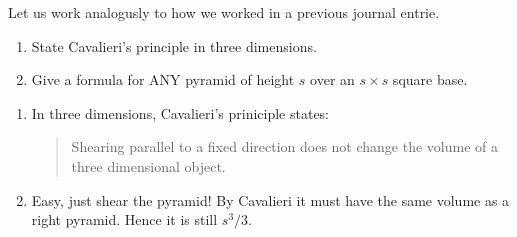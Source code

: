 \documentclass[nooutcomes,noauthor,handout]{ximera}
\begin{document}
\begin{question}
  Let us work analogusly to how we worked in a previous journal
  entrie.
  \begin{enumerate}
  \item State Cavalieri's principle in three dimensions.
  \item Give a formula for ANY pyramid of height $s$ over an $s\times
    s$ square base.
  \end{enumerate}
    \begin{freeResponse}
      \begin{enumerate}
      \item In three dimensions, Cavalieri's priniciple states:
        \begin{quote}
          Shearing parallel to a fixed direction does not change the
          volume of a three dimensional object.
        \end{quote}
      \item Easy, just shear the pyramid! By Cavalieri it must have
        the same volume as a right pyramid. Hence it is still $s^3/3$.
      \end{enumerate}
    \end{freeResponse}
\end{question}
\end{document}
